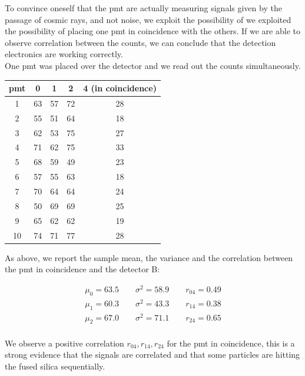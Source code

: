 To convince oneself that the pmt are actually measuring signals given by the passage of cosmic rays, and not noise, we exploit the possibility of we exploited the possibility of placing one pmt in coincidence with the others. If we are able to observe correlation between the counts, we can conclude that the detection electronics are working correctly. \\
One pmt was placed over the detector and we read out the counts simultaneously.

\begin{center}
\begin{tabular}{|c|c|c|c|c|}
\hline 
pmt & 0 & 1 & 2 & 4 (in coincidence) \\ 
\hline 
1 & 63 & 57 & 72 & 28 \\ 
\hline 
2 & 55 & 51 & 64 & 18 \\ 
\hline 
3 & 62 & 53 & 75 & 27 \\ 
\hline 
4 & 71 & 62 & 75 & 33 \\ 
\hline 
5 & 68 & 59 & 49 & 23 \\ 
\hline 
6 & 57 & 55 & 63 & 18 \\ 
\hline 
7 & 70 & 64 & 64 & 24 \\ 
\hline 
8 & 50 & 69 & 69 & 25 \\ 
\hline 
9 & 65 & 62 & 62 & 19 \\ 
\hline 
10 & 74 & 71 & 77 & 28 \\ 
\hline 
\end{tabular} 
\end{center} 

As above, we report the sample mean, the variance and the correlation between the pmt in coincidence and the detector B:

\begin{equation*}
\begin{split}
\mu_{0} = 63.5 \qquad \sigma^{2} = 58.9 \qquad r_{04} = 0.49 \\
\mu_{1} = 60.3 \qquad \sigma^{2} = 43.3 \qquad r_{14} = 0.38 \\
\mu_{2} = 67.0 \qquad \sigma^{2} = 71.1 \qquad r_{24} = 0.65 \\
\end{split}
\end{equation*}

We observe a positive correlation $r_{04},r_{14},r_{24}$ for the pmt in coincidence, this is a strong evidence that the signals are correlated and that some particles are hitting the fused silica sequentially. \smallskip

